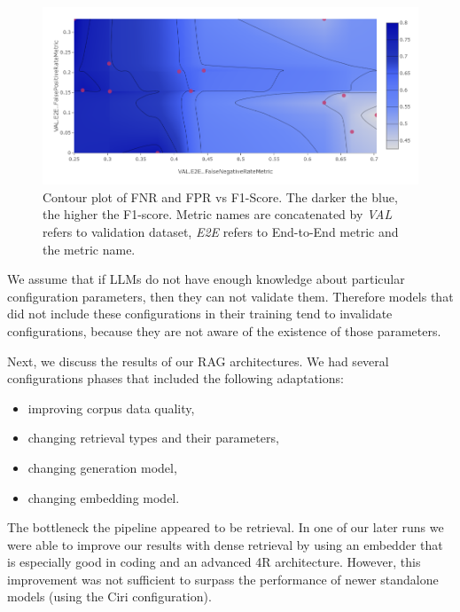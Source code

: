 \begin{figure}[!ht]
    \centering
    \includegraphics[width=\textwidth]{images/FNR-FPR-F1.png}
    \caption{Contour plot of FNR and FPR vs F1-Score. The darker the blue, the higher the F1-score. Metric names are concatenated by \textit{VAL} refers to validation dataset, \textit{E2E} refers to End-to-End metric and the metric name.}
    \label{fig:fnrfpr}
\end{figure}

We assume that if LLMs do not have enough knowledge about particular configuration parameters, then they can not validate them. Therefore models that did not include these configurations in their training tend to invalidate configurations, because they are not aware of the existence of those parameters.

Next, we discuss the results of our RAG architectures. We had several configurations phases that included the following adaptations:
\begin{itemize}
    \item improving corpus data quality,
    \item changing retrieval types and their parameters,
    \item changing generation model,
    \item changing embedding model.
\end{itemize}

The bottleneck the pipeline appeared to be retrieval. In one of our later runs we were able to improve our results with dense retrieval by using an embedder that is especially good in coding and an advanced 4R architecture. However, this improvement was not sufficient to surpass the performance of newer standalone models (using the Ciri configuration). 

